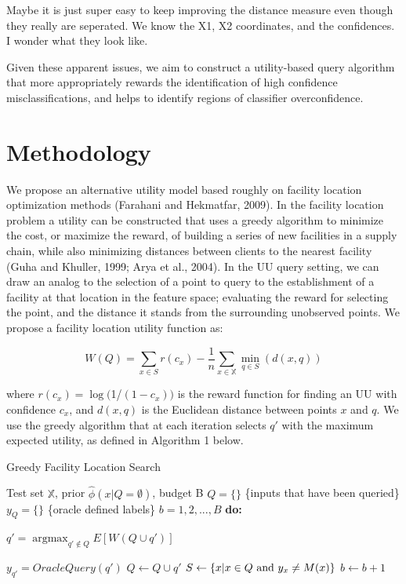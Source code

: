 \documentclass[letterpaper]{article} %
\DeclareMathOperator*{\argmax}{argmax}
\newcommand{\km}[1]{{\color{red} #1}} %
\newcommand{\wdb}[1]{{\color{blue} #1}} %
\begin{document}
\wdb{Maybe it is just super easy to keep improving the distance measure even though they really are seperated.  We know the X1, X2 coordinates, and the confidences.  I wonder what they look like.}

Given these apparent issues, we aim to construct a utility-based query algorithm that more appropriately rewards the identification of high confidence misclassifications, and helps to identify regions of classifier overconfidence. 

\section{Methodology}

We propose an alternative utility model based roughly on facility location optimization methods  \km{(Farahani and Hekmatfar, 2009)}. In the facility location problem a utility can be constructed that uses a greedy algorithm to minimize the cost, or maximize the reward, of building a series of new facilities in a supply chain, while also minimizing distances between clients to the nearest facility  \km{(Guha and Khuller, 1999; Arya et al., 2004)}. In the UU query setting, we can draw an analog to the selection of a point to query to the establishment of a facility at that location in the feature space; evaluating the reward for selecting the point, and the distance it stands from the surrounding unobserved points. We propose a facility location utility function as: 

$$W(Q) = \sum_{x \in S} r \left(c_x\right) - \frac{1}{n} \sum_{x \in \mathbb{X}} \min_{q \in S}\left(d\left(x,q\right)\right)$$

where $r\left(c_x\right) = \log($1/$(1-c_x))$ is the reward function for finding an UU with confidence $c_{x}$, and $d(x,q)$ is the Euclidean distance between points $x$ and $q$. We use the greedy algorithm that at each iteration selects $q'$ with the maximum expected utility, as defined in Algorithm 1 below. 

\begin{algorithm}
	\caption{Greedy Facility Location Search}
	\label{alg:Greedy}
	\begin{algorithmic}
		 Test set $\mathbb{X}$, prior $\hat{\phi}\left(x|Q=\emptyset\right)$, budget B
		\STATE $Q=\{\}$ \{inputs that have been queried\}
		\STATE $y_Q = \{\}$ \{oracle defined labels\}
		 $b = 1, 2, ..., B$ {\bfseries do:}

		\STATE $q' = \argmax_{q' \not\in Q} E \left[W\left(Q \cup q'\right) \right]$
		
		\STATE $y_{q'} = OracleQuery(q')$
		\STATE $Q \leftarrow Q \cup q'$
		\STATE $S \leftarrow \left\{x | x \in Q \space \text{ and } y_x \neq M(x) \right\}$
		\STATE $b \leftarrow b + 1$
			

	\end{algorithmic}
\end{algorithm}
\end{document}
